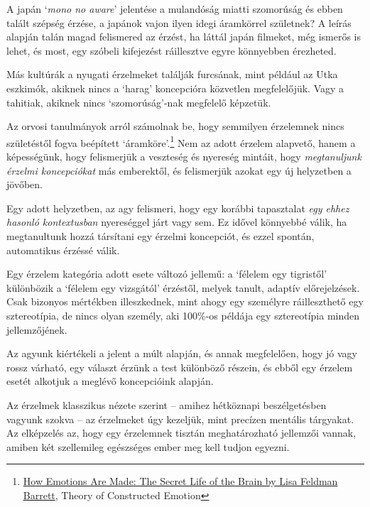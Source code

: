 A japán `\emph{mono no aware}' jelentése a mulandóság miatti szomorúság
és ebben talált szépség érzése, a japánok vajon ilyen idegi áramkörrel
születnek? A leírás alapján talán magad felismered az érzést, ha láttál
japán filmeket, még ismerős is lehet, és most, egy szóbeli kifejezést
ráillesztve egyre könnyebben érezheted.

Más kultúrák a nyugati érzelmeket találják furcsának, mint például az
Utka eszkimók, akiknek nincs a `harag' koncepcióra közvetlen
megfelelőjük. Vagy a tahitiak, akiknek nincs `szomorúság'-nak megfelelő
képzetük.

\enlargethispage*{\baselineskip}

Az orvosi tanulmányok arról számolnak be, hogy semmilyen érzelemnek
nincs születéstől fogva beépített `áramköre'.\footnote{\href{https://www.goodreads.com/book/show/23719305-how-emotions-are-made}{How
  Emotions Are Made: The Secret Life of the Brain by Lisa Feldman
  Barrett}, Theory of Constructed Emotion} Nem az adott érzelem
alapvető, hanem a képességünk, hogy felismerjük a veszteség és nyereség
mintáit, hogy \emph{megtanuljunk érzelmi koncepciókat} más emberektől,
és felismerjük azokat egy új helyzetben a jövőben.

Egy adott helyzetben, az agy felismeri, hogy egy korábbi tapasztalat
\emph{egy ehhez hasonló kontextusban} nyereséggel járt vagy sem. Ez
idővel könnyebbé válik, ha megtanultunk hozzá társítani egy érzelmi
koncepciót, és ezzel spontán, automatikus érzéssé válik.

Egy érzelem kategória adott esete változó jellemű: a `félelem egy
tigristől' különbözik a `félelem egy vizsgától' érzéstől, melyek tanult,
adaptív előrejelzések. Csak bizonyos mértékben illeszkednek, mint ahogy
egy személyre ráilleszthető egy sztereotípia, de nincs olyan személy,
aki 100\%-os példája egy sztereotípia minden jellemzőjének.

Az agyunk kiértékeli a jelent a múlt alapján, és annak megfelelően, hogy
jó vagy rossz várható, egy választ érzünk a test különböző részein, és
ebből egy érzelem esetét alkotjuk a meglévő koncepcióink alapján.


Az érzelmek klasszikus nézete szerint -- amihez hétköznapi
beszélgetésben vagyunk szokva -- az érzelmeket úgy kezeljük, mint
precízen mentális tárgyakat. Az elképzelés az, hogy egy érzelemnek
tisztán meghatározható jellemzői vannak, amiben két szellemileg
egészséges ember meg kell tudjon egyezni.


